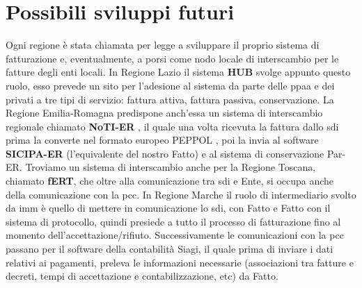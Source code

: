 \chapter{Possibili sviluppi futuri}

Ogni regione è stata chiamata per legge a sviluppare il proprio sistema di fatturazione e, eventualmente, a porsi come nodo locale di interscambio per le fatture degli enti locali.
In Regione Lazio il sistema \textbf{HUB} \cite{hub} svolge appunto questo ruolo, esso prevede un sito per l'adesione al sistema da parte delle \Gls{ppaa} e dei privati a tre tipi di servizio: fattura attiva, fattura passiva, conservazione.
La Regione Emilia-Romagna predispone anch'essa un sistema di interscambio regionale chiamato \textbf{NoTI-ER} \cite{notier}, il quale una volta ricevuta la fattura dallo \Gls{sdi} prima la converte nel formato europeo PEPPOL \cite{peppol}, poi la invia al software \textbf{SICIPA-ER} (l'equivalente del nostro Fatto) e al sistema di conservazione Par-ER.
Troviamo un sistema di interscambio anche per la Regione Toscana, chiamato \textbf{fERT}, che oltre alla comunicazione tra \Gls{sdi} e Ente, si occupa anche della comunicazione con la \Gls{pcc}.
In Regione Marche il ruolo di intermediario svolto da \Gls{imm} \cite{intermedia} è quello di mettere in comunicazione lo \Gls{sdi}, con Fatto e Fatto con il sistema di protocollo, quindi presiede a tutto il processo di fatturazione fino al momento dell'accettazione/rifiuto.
Successivamente le comunicazioni con la \Gls{pcc} passano per il software della contabilità Siagi, il quale prima di inviare i dati relativi ai pagamenti, preleva le informazioni necessarie (associazioni tra fatture e decreti, tempi di accettazione e contabilizzazione, etc) da Fatto.





